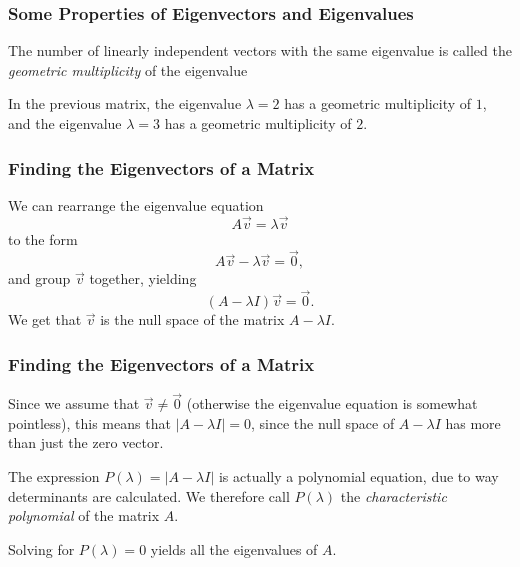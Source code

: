 \begin{frame}
	\frametitle{Some Properties of Eigenvectors and Eigenvalues}
	\begin{presentation_definition}
		The number of linearly independent vectors with the same eigenvalue is called the \emph{geometric multiplicity} of the eigenvalue
	\end{presentation_definition}
	\begin{presentation_example}
		In the previous matrix, the eigenvalue $\lambda=2$ has a geometric multiplicity of $1$, and the eigenvalue $\lambda=3$ has a geometric multiplicity of $2$.
	\end{presentation_example}
\end{frame}

\begin{frame}
	\frametitle{Finding the Eigenvectors of a Matrix}
	We can rearrange the eigenvalue equation 
	\begin{equation*}
		A\vec{v} = \lambda\vec{v}
	\end{equation*}
	to the form
	\begin{equation*}
		A\vec{v} - \lambda\vec{v} = \vec{0},
	\end{equation*}
	and group $\vec{v}$ together, yielding
	\begin{equation*}
		\left(A - \lambda I\right)\vec{v} = \vec{0}.
	\end{equation*}
	We get that $\vec{v}$ is the null space of the matrix $A-\lambda I$.
\end{frame}

\begin{frame}
	\frametitle{Finding the Eigenvectors of a Matrix}
	Since we assume that $\vec{v}\neq\vec{0}$ (otherwise the eigenvalue equation is somewhat pointless), this means that $\left| A-\lambda I \right|=0$, since the null space of $A-\lambda I$ has more than just the zero vector.

	The expression $P(\lambda)=\left| A-\lambda I \right|$ is actually a polynomial equation, due to way determinants are calculated. We therefore call $P(\lambda)$ the \emph{characteristic polynomial} of the matrix $A$.

	Solving for $P(\lambda)=0$ yields all the eigenvalues of $A$.
\end{frame}

